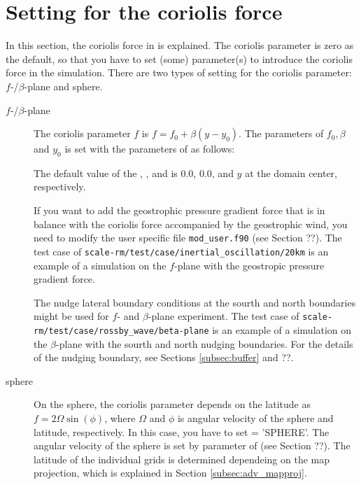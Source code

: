 \section{Setting for the coriolis force} \label{subsec:coriolis}

In this section, the coriolis force in \scalerm is explained.
The coriolis parameter is zero as the default, so that you have to set (some) parameter(s) to introduce the coriolis force in the simulation.
There are two types of setting for the coriolis parameter: $f$-/$\beta$-plane and sphere.

\begin{description}
\item[$f$-/$\beta$-plane]
  The coriolis parameter $f$ is $f=f_0 + \beta (y-y_0)$.
  The parameters of $f_0, \beta$ and $y_0$ is set with the parameters of  as follows:

  The default value of the , , and  is 0.0, 0.0, and $y$ at the domain center, respectively.

  If you want to add the geostrophic pressure gradient force that is in balance with the coriolis force accompanied by the geostrophic wind, you need to modify the user specific file \verb|mod_user.f90| (see Section ??).
  The test case of \verb|scale-rm/test/case/inertial_oscillation/20km| is an example of a simulation on the $f$-plane with the geostropic pressure gradient force.

  The nudge lateral boundary conditions at the sourth and north boundaries might be used for $f$- and $\beta$-plane experiment.
  The test case of \verb|scale-rm/test/case/rossby_wave/beta-plane| is an example of a simulation on the $\beta$-plane with the sourth and north nudging boundaries.
  For the details of the nudging boundary, see Sections \ref{subsec:buffer} and ??.

\item[sphere]
  On the sphere, the coriolis parameter depends on the latitude as $f = 2\Omega \sin(\phi)$, where $\Omega$ and $\phi$ is angular velocity of the sphere and latitude, respectively.
  In this case, you have to set  = 'SPHERE'.
  The angular velocity of the sphere is set by  parameter of  (see Section ??).
  The latitude of the individual grids is determined dependeing on the map projection, which is explained in Section \ref{subsec:adv_mapproj}.

\end{description}
